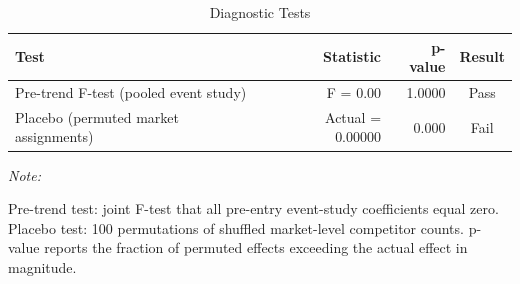 \begin{table}[!h]
\centering
\caption{\label{tab:tab:diagnostics}Diagnostic Tests}
\centering
\begin{threeparttable}
\begin{tabular}[t]{lrrc}
\toprule
Test & Statistic & p-value & Result\\
\midrule
Pre-trend F-test (pooled event study) & F = 0.00 & 1.0000 & Pass\\
Placebo (permuted market assignments) & Actual = 0.00000 & 0.000 & Fail\\
\bottomrule
\end{tabular}
\begin{tablenotes}
\item \textit{Note: } 
\item Pre-trend test: joint F-test that all pre-entry event-study coefficients equal zero. Placebo test: 100 permutations of shuffled market-level competitor counts. p-value reports the fraction of permuted effects exceeding the actual effect in magnitude.
\end{tablenotes}
\end{threeparttable}
\end{table}
